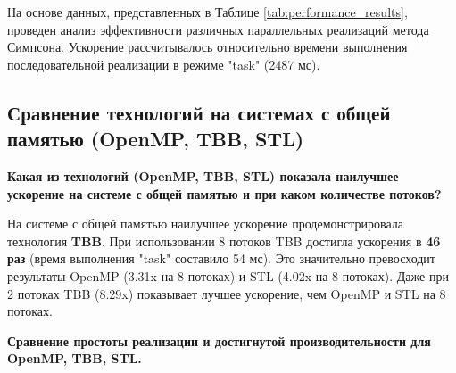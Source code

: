\documentclass[a4paper,12pt]{article}
\begin{document}
На основе данных, представленных в Таблице \ref{tab:performance_results}, проведен анализ эффективности различных параллельных реализаций метода Симпсона. Ускорение рассчитывалось относительно времени выполнения последовательной реализации в режиме "task" (2487 мс).

\subsection*{Сравнение технологий на системах с общей памятью (OpenMP, TBB, STL)}

\textbf{Какая из технологий (OpenMP, TBB, STL) показала наилучшее ускорение на системе с общей памятью и при каком количестве потоков?}

На системе с общей памятью наилучшее ускорение продемонстрировала технология \textbf{TBB}. При использовании 8 потоков TBB достигла ускорения в \textbf{46 раз} (время выполнения "task" составило 54 мс). Это значительно превосходит результаты OpenMP (3.31x на 8 потоках) и STL (4.02x на 8 потоках). Даже при 2 потоках TBB (8.29x) показывает лучшее ускорение, чем OpenMP и STL на 8 потоках.

\textbf{Сравнение простоты реализации и достигнутой производительности для OpenMP, TBB, STL.}
\end{document}
